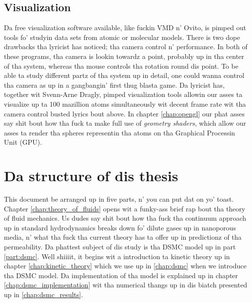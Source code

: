 \subsection{Visualization}
Da free visualization software available, like fuckin VMD n' Ovito, is pimped out tools fo' studyin data sets from atomic or molecular models. There is two dope drawbacks tha lyricist has noticed; tha camera control n' performance. In both of these programs, tha camera is lookin towardz a point, probably up in tha center of tha system, whereas tha mouse controls tha rotation round dis point. To be able ta study different partz of tha system up in detail, one could wanna control tha camera as up in a gangbangin' first thug blasta game. Da lyricist has, together wit Svenn-Arne Dragly, pimped visualization tools allowin our asses ta visualize up ta 100 mazillion atoms simultaneously wit decent frame rate wit tha camera control busted lyrics bout above. In chapter \ref{chap:opengl} our phat asses say shit bout how tha fuck ta make full use of \textit{geometry shaders}, which allow our asses ta render tha spheres representin tha atoms on tha Graphical Processin Unit (GPU). 

\section{Da structure of dis thesis}
\label{sec:structure}
This document be arranged up in five parts, n' you can put dat on yo' toast. Chapter \ref{chap:theory_of_fluids} opens wit a funky-ass brief rap bout tha theory of fluid mechanics. Us dudes say shit bout how tha fuck tha continuum approach up in standard hydrodynamics breaks down fo' dilute gases up in nanoporous media, n' what tha fuck tha current theory has ta offer up in predictionz of tha permeability. Da phattest subject of dis study is tha DSMC model up in part \ref{part:dsmc}. Well shiiiit, it begins wit a introduction ta kinetic theory up in chapter \ref{chap:kinetic_theory} which we use up in \ref{chap:dsmc} when we introduce tha DSMC model. Da implementation of tha model is explained up in chapter \ref{chap:dsmc_implementation} wit tha numerical thangs up in dis biatch presented up in \ref{chap:dsmc_results}.

